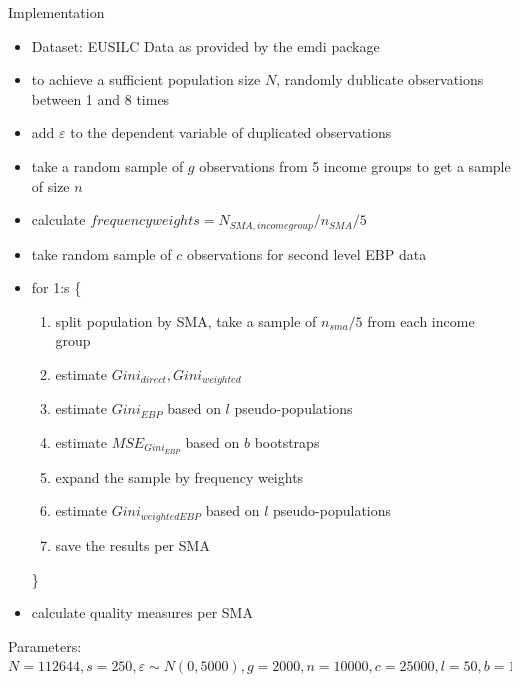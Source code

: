 \documentclass[fleqn,final]{beamer}
\newcommand{\Pheight}{\rule[-5mm]{0cm}{1cm}}
\begin{document}
\begin{frame}
\begin{columns}[t]


\begin{column}{.3\linewidth}


\begin{block}{Implementation \Pheight}
\begin{itemize}
\item Dataset: EUSILC Data as provided by the emdi package
\item to achieve a sufficient population size $N$, randomly dublicate observations between 1 and 8 times
\item add $\varepsilon$ to the dependent variable of duplicated observations
\item take a random sample of $g$ observations from 5 income groups to get a sample of size $n$
\item calculate $frequency weights = N_{SMA,income group}/n_{SMA}/5 $
\item take random sample of $c$ observations for second level EBP data 
 
\item for 1:s \{
\begin{enumerate}  %
\item split population by SMA, take a sample of $n_{sma} / 5$ from each income group
\item estimate $Gini_{direct}, Gini_{weighted}$
\item estimate $Gini_{EBP}$  based on $l$ pseudo-populations
\item estimate $MSE_{Gini_{EBP}}$ based on $b$ bootstraps
\item expand the sample by frequency weights
\item estimate $Gini_{weighted EBP}$  based on $l$ pseudo-populations
\item save the results per SMA
\end{enumerate}
\}
 
\item calculate quality measures per SMA 
 \end{itemize}
Parameters: $N=112644, s=250, \varepsilon \sim N(0,5000), g=2000, n=10000, c=25000, l=50, b=10, SMA=District$
\end{block}



 
\end{column}



%
%
  

\end{columns}
\end{frame}
\end{document}
